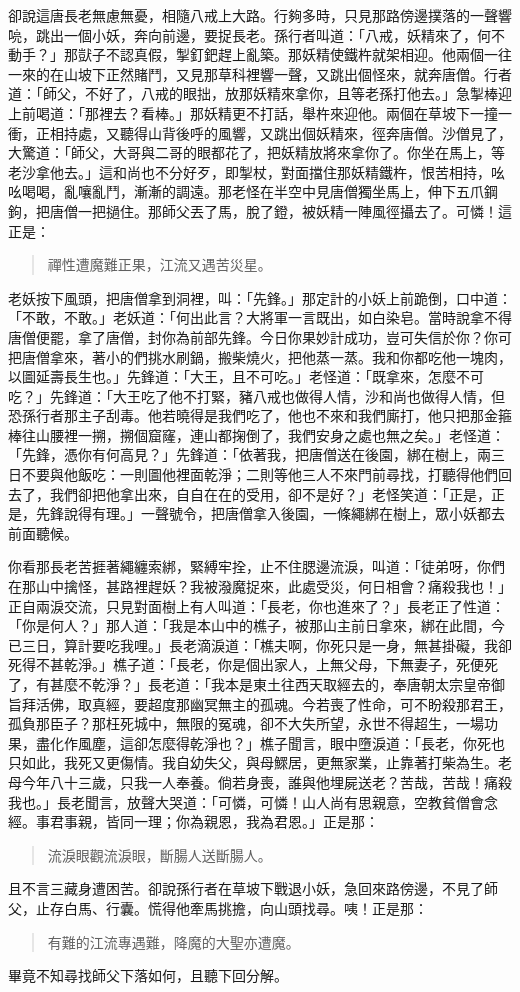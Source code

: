 卻說這唐長老無慮無憂，相隨八戒上大路。行夠多時，只見那路傍邊撲落的一聲響喨，跳出一個小妖，奔向前邊，要捉長老。孫行者叫道：「八戒，妖精來了，何不動手？」那獃子不認真假，掣釘鈀趕上亂築。那妖精使鐵杵就架相迎。他兩個一往一來的在山坡下正然賭鬥，又見那草科裡響一聲，又跳出個怪來，就奔唐僧。行者道：「師父，不好了，八戒的眼拙，放那妖精來拿你，且等老孫打他去。」急掣棒迎上前喝道：「那裡去？看棒。」那妖精更不打話，舉杵來迎他。兩個在草坡下一撞一衝，正相持處，又聽得山背後呼的風響，又跳出個妖精來，徑奔唐僧。沙僧見了，大驚道：「師父，大哥與二哥的眼都花了，把妖精放將來拿你了。你坐在馬上，等老沙拿他去。」這和尚也不分好歹，即掣杖，對面擋住那妖精鐵杵，恨苦相持，吆吆喝喝，亂嚷亂鬥，漸漸的調遠。那老怪在半空中見唐僧獨坐馬上，伸下五爪鋼鉤，把唐僧一把撾住。那師父丟了馬，脫了鐙，被妖精一陣風徑攝去了。可憐！這正是：
\begin{quote}
禪性遭魔難正果，江流又遇苦災星。
\end{quote}

老妖按下風頭，把唐僧拿到洞裡，叫：「先鋒。」那定計的小妖上前跪倒，口中道：「不敢，不敢。」老妖道：「何出此言？大將軍一言既出，如白染皂。當時說拿不得唐僧便罷，拿了唐僧，封你為前部先鋒。今日你果妙計成功，豈可失信於你？你可把唐僧拿來，著小的們挑水刷鍋，搬柴燒火，把他蒸一蒸。我和你都吃他一塊肉，以圖延壽長生也。」先鋒道：「大王，且不可吃。」老怪道：「既拿來，怎麼不可吃？」先鋒道：「大王吃了他不打緊，豬八戒也做得人情，沙和尚也做得人情，但恐孫行者那主子刮毒。他若曉得是我們吃了，他也不來和我們廝打，他只把那金箍棒往山腰裡一搠，搠個窟窿，連山都掬倒了，我們安身之處也無之矣。」老怪道：「先鋒，憑你有何高見？」先鋒道：「依著我，把唐僧送在後園，綁在樹上，兩三日不要與他飯吃：一則圖他裡面乾淨；二則等他三人不來門前尋找，打聽得他們回去了，我們卻把他拿出來，自自在在的受用，卻不是好？」老怪笑道：「正是，正是，先鋒說得有理。」一聲號令，把唐僧拿入後園，一條繩綁在樹上，眾小妖都去前面聽候。

你看那長老苦捱著繩纏索綁，緊縛牢拴，止不住腮邊流淚，叫道：「徒弟呀，你們在那山中擒怪，甚路裡趕妖？我被潑魔捉來，此處受災，何日相會？痛殺我也！」正自兩淚交流，只見對面樹上有人叫道：「長老，你也進來了？」長老正了性道：「你是何人？」那人道：「我是本山中的樵子，被那山主前日拿來，綁在此間，今已三日，算計要吃我哩。」長老滴淚道：「樵夫啊，你死只是一身，無甚掛礙，我卻死得不甚乾淨。」樵子道：「長老，你是個出家人，上無父母，下無妻子，死便死了，有甚麼不乾淨？」長老道：「我本是東土往西天取經去的，奉唐朝太宗皇帝御旨拜活佛，取真經，要超度那幽冥無主的孤魂。今若喪了性命，可不盼殺那君王，孤負那臣子？那枉死城中，無限的冤魂，卻不大失所望，永世不得超生，一場功果，盡化作風塵，這卻怎麼得乾淨也？」樵子聞言，眼中墮淚道：「長老，你死也只如此，我死又更傷情。我自幼失父，與母鰥居，更無家業，止靠著打柴為生。老母今年八十三歲，只我一人奉養。倘若身喪，誰與他埋屍送老？苦哉，苦哉！痛殺我也。」長老聞言，放聲大哭道：「可憐，可憐！山人尚有思親意，空教貧僧會念經。事君事親，皆同一理；你為親恩，我為君恩。」正是那：
\begin{quote}
流淚眼觀流淚眼，斷腸人送斷腸人。
\end{quote}

且不言三藏身遭困苦。卻說孫行者在草坡下戰退小妖，急回來路傍邊，不見了師父，止存白馬、行囊。慌得他牽馬挑擔，向山頭找尋。咦！正是那：
\begin{quote}
有難的江流專遇難，降魔的大聖亦遭魔。
\end{quote}

畢竟不知尋找師父下落如何，且聽下回分解。
